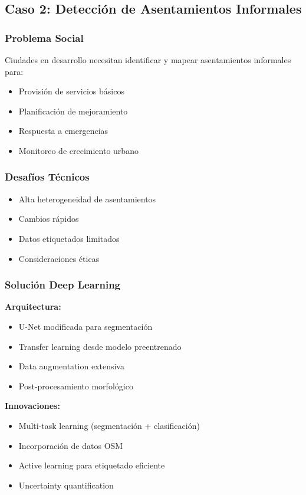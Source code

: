 \documentclass[12pt,a4paper]{article}
\begin{document}
\subsection{Caso 2: Detección de Asentamientos Informales}

\subsubsection{Problema Social}

Ciudades en desarrollo necesitan identificar y mapear asentamientos informales para:
\begin{itemize}
    \item Provisión de servicios básicos
    \item Planificación de mejoramiento
    \item Respuesta a emergencias
    \item Monitoreo de crecimiento urbano
\end{itemize}

\subsubsection{Desafíos Técnicos}

\begin{itemize}
    \item Alta heterogeneidad de asentamientos
    \item Cambios rápidos
    \item Datos etiquetados limitados
    \item Consideraciones éticas
\end{itemize}

\subsubsection{Solución Deep Learning}

\textbf{Arquitectura:}
\begin{itemize}
    \item U-Net modificada para segmentación
    \item Transfer learning desde modelo preentrenado
    \item Data augmentation extensiva
    \item Post-procesamiento morfológico
\end{itemize}

\textbf{Innovaciones:}
\begin{itemize}
    \item Multi-task learning (segmentación + clasificación)
    \item Incorporación de datos OSM
    \item Active learning para etiquetado eficiente
    \item Uncertainty quantification
\end{itemize}
\end{document}

